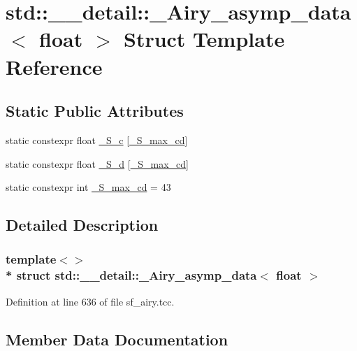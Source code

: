 \hypertarget{structstd_1_1____detail_1_1__Airy__asymp__data_3_01float_01_4}{}\section{std\+:\+:\+\_\+\+\_\+detail\+:\+:\+\_\+\+Airy\+\_\+asymp\+\_\+data$<$ float $>$ Struct Template Reference}
\label{structstd_1_1____detail_1_1__Airy__asymp__data_3_01float_01_4}
\subsection*{Static Public Attributes}
\begin{DoxyCompactItemize}
\item 
static constexpr float \hyperlink{structstd_1_1____detail_1_1__Airy__asymp__data_3_01float_01_4_a8fc68acdbcbc59f4ecfdd4bc2f4f2a1e}{\+\_\+\+S\+\_\+c} \mbox{[}\hyperlink{structstd_1_1____detail_1_1__Airy__asymp__data_3_01float_01_4_ac0e59b83a90623587f20cdc32a9e7565}{\+\_\+\+S\+\_\+max\+\_\+cd}\mbox{]}
\item 
static constexpr float \hyperlink{structstd_1_1____detail_1_1__Airy__asymp__data_3_01float_01_4_ad947443d5860fcd25d25ad6d04ea3bb3}{\+\_\+\+S\+\_\+d} \mbox{[}\hyperlink{structstd_1_1____detail_1_1__Airy__asymp__data_3_01float_01_4_ac0e59b83a90623587f20cdc32a9e7565}{\+\_\+\+S\+\_\+max\+\_\+cd}\mbox{]}
\item 
static constexpr int \hyperlink{structstd_1_1____detail_1_1__Airy__asymp__data_3_01float_01_4_ac0e59b83a90623587f20cdc32a9e7565}{\+\_\+\+S\+\_\+max\+\_\+cd} = 43
\end{DoxyCompactItemize}


\subsection{Detailed Description}
\subsubsection*{template$<$$>$\\*
struct std\+::\+\_\+\+\_\+detail\+::\+\_\+\+Airy\+\_\+asymp\+\_\+data$<$ float $>$}



Definition at line 636 of file sf\+\_\+airy.\+tcc.



\subsection{Member Data Documentation}
